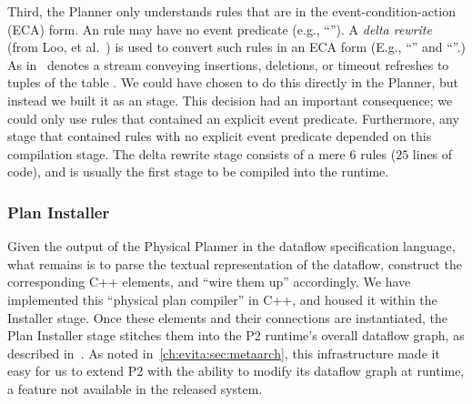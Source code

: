 
Third, the Planner only understands rules that are in the
event-condition-action (ECA) form. An \OVERLOG rule may have no event
predicate (e.g., ``'').  A {\em delta rewrite}
(from Loo, et al.~\cite{loo-sigmod06}) is used to convert such rules in an ECA
form (E.g., ``'' and ``''.) As in~\cite{loo-sigmod06}  denotes
a stream conveying insertions, deletions, or timeout refreshes to tuples of the
table .  We could have chosen to do this directly in the Planner, but
instead we built it as an \OVERLOG stage.  This decision had an
important consequence; we could only use rules that contained an explicit event
predicate.  Furthermore, any \OVERLOG stage that contained rules with no
explicit event predicate depended on this compilation stage.  The delta rewrite
\OVERLOG stage consists of a mere $6$ rules ($25$ lines of code), and is
usually the first \OVERLOG stage to be compiled into the runtime.
 

\subsubsection{Plan Installer}
\label{ch:evita:sec:installer}

Given the output of the Physical Planner in the dataflow specification
language, what remains is to parse the
textual representation of the dataflow,  construct the
corresponding C++ elements, and ``wire them up'' accordingly. We have
implemented this 
``physical plan compiler'' in C++, and housed it within the
Installer stage.  Once these elements and their connections are
instantiated, the Plan Installer stage stitches them into the P2
runtime's overall dataflow graph, as described in~\cite{p2:sosp}.
As noted in~\ref{ch:evita:sec:metaarch}, this infrastructure made it easy for us to extend P2 with the ability to modify its dataflow graph at runtime,
a feature not available in the released system. 
% 


